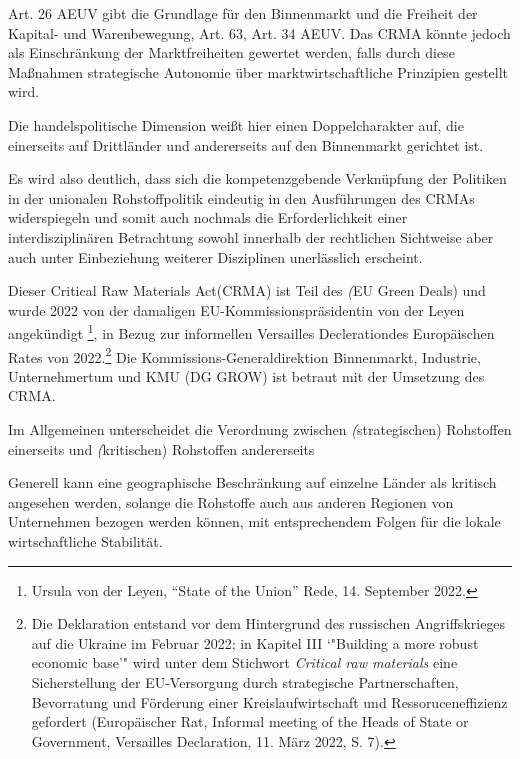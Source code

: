\documentclass[12pt,a4paper,oneside]{book} %
\begin{document}
Art. 26 AEUV gibt die Grundlage für den Binnenmarkt und die Freiheit der Kapital- und Warenbewegung, Art. 63, Art. 34 AEUV. Das CRMA könnte jedoch als Einschränkung der Marktfreiheiten gewertet werden, falls durch diese Maßnahmen strategische Autonomie über marktwirtschaftliche Prinzipien gestellt wird.


Die handelspolitische Dimension weißt hier einen Doppelcharakter auf, die einerseits auf Drittländer und andererseits auf den Binnenmarkt gerichtet ist.\autocite{Paschke, Rdtw 2024, 206, 211f}


Es wird also deutlich, dass sich die kompetenzgebende Verknüpfung der Politiken in der unionalen Rohstoffpolitik eindeutig in den Ausführungen des CRMAs widerspiegeln und somit auch nochmals die Erforderlichkeit einer interdisziplinären Betrachtung sowohl innerhalb der rechtlichen Sichtweise aber auch unter Einbeziehung weiterer Disziplinen unerlässlich erscheint. 


Dieser \glqq Critical Raw Materials Act\grqq (CRMA) ist Teil des \textit(EU Green Deals) und wurde 2022 von der damaligen EU-Kommissionspräsidentin von der Leyen angekündigt \footnote{Ursula von der Leyen, "`State of the Union"' Rede, 14. September 2022.}, in Bezug zur informellen \glqq Versailles Decleration\grqq des Europäischen Rates von 2022.\footnote{Die Deklaration entstand vor dem Hintergrund des russischen Angriffskrieges auf die Ukraine im Februar 2022; in Kapitel III `"Building a more robust economic base'" wird unter dem Stichwort \textit{Critical raw materials} eine Sicherstellung der EU-Versorgung durch strategische Partnerschaften, Bevorratung und Förderung einer Kreislaufwirtschaft und Ressoruceneffizienz gefordert (Europäischer Rat, Informal meeting of the Heads of State or Government, Versailles Declaration, 11. März 2022, S. 7).} Die Kommissions-Generaldirektion Binnenmarkt, Industrie, Unternehmertum und KMU (DG GROW) ist betraut mit der Umsetzung des CRMA.

Im Allgemeinen unterscheidet die Verordnung zwischen \textit(strategischen) Rohstoffen einerseits und \textit(kritischen) Rohstoffen andererseits

Generell kann eine geographische Beschränkung auf einzelne Länder als kritisch angesehen werden, solange die Rohstoffe auch aus anderen Regionen von Unternehmen bezogen werden können, mit entsprechendem Folgen für die lokale wirtschaftliche Stabilität.\autocite[s. hierzu]{ruettinger_doddfrank_2015}
\end{document}
